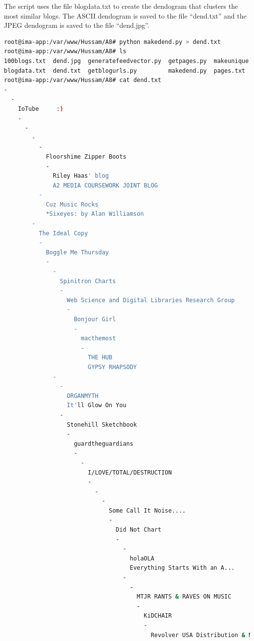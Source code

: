 \documentclass[a4paper, 11pt]{article}
\begin{document}


The script uses the file blogdata.txt to create the dendogram that clusters the most similar blogs. The ASCII dendogram is saved to the file ``dend.txt'' and the JPEG dendogram is saved to the file ``dend.jpg''.
\begin{lstlisting}[language=bash, breakatwhitespace=〈false), label=Running makedend.py, caption=Running makedend.py]
root@ima-app:/var/www/Hussam/A8# python makedend.py > dend.txt
root@ima-app:/var/www/Hussam/A8# ls
100blogs.txt  dend.jpg  generatefeedvector.py  getpages.py  makeunique.py  uniqueurls.txt
blogdata.txt  dend.txt  getblogurls.py         makedend.py  pages.txt      urls.txt
root@ima-app:/var/www/Hussam/A8# cat dend.txt
-
  -
    IoTube     :)
    -
      -
        -
          -
            Floorshime Zipper Boots
            -
              Riley Haas' blog
              A2 MEDIA COURSEWORK JOINT BLOG
          -
            Cuz Music Rocks
            *Sixeyes: by Alan Williamson
        -
          The Ideal Copy
          -
            Boggle Me Thursday
            -
              -
                Spinitron Charts
                -
                  Web Science and Digital Libraries Research Group
                  -
                    Bonjour Girl
                    -
                      macthemost
                      -
                        THE HUB
                        GYPSY RHAPSODY
              -
                -
                  ORGANMYTH
                  It'll Glow On You
                -
                  Stonehill Sketchbook
                  -
                    guardtheguardians
                    -
                      -
                        I/LOVE/TOTAL/DESTRUCTION
                        -
                          -
                            -
                              Some Call It Noise....
                              -
                                Did Not Chart
                                -
                                  -
                                    holaOLA
                                    Everything Starts With an A...
                                  -
                                    -
                                      MTJR RANTS & RAVES ON MUSIC
                                      -
                                        KiDCHAIR
                                        -
                                          Revolver USA Distribution & Midheaven mailorder

\end{lstlisting}
\end{document}
